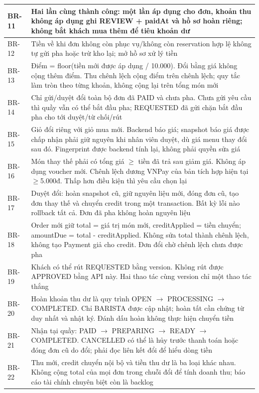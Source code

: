 \begin{longtable}{|>{\raggedright\arraybackslash}p{}|>{\raggedright\arraybackslash}p{}|}
BR-11 & Hai lần cùng thành công: một lần áp dụng cho đơn, khoản thu không áp dụng ghi REVIEW + paidAt và hồ sơ hoàn riêng; không bắt khách mua thêm để tiêu khoản dư \\ \hline
BR-12 & Tiền về khi đơn không còn phục vụ/không còn reservation hợp lệ không tự gửi pha hoặc trừ kho lại; mở hồ sơ xử lý tiền \\ \hline
BR-13 & Điểm = floor(tiền mới được áp dụng / 10.000). Đổi bằng giá không cộng thêm điểm. Thu chênh lệch cộng điểm trên chênh lệch; quy tắc làm tròn theo từng khoản, không cộng lại trên tổng món mới \\ \hline
BR-14 & Chỉ gửi/duyệt đổi toàn bộ đơn đã PAID và chưa pha. Chưa gửi yêu cầu thì quầy vẫn có thể bắt đầu pha; REQUESTED đã gửi chặn bắt đầu pha cho tới duyệt/từ chối/rút \\ \hline
BR-15 & Giỏ đổi riêng với giỏ mua mới. Backend báo giá; snapshot báo giá được chấp nhận phải giữ nguyên khi nhân viên duyệt, dù giá menu thay đổi sau đó. Fingerprint được backend tính lại, không phải quyền sửa giá \\ \hline
BR-16 & Món thay thế phải có tổng giá \(\geq\) tiền đã trả sau giảm giá. Không áp dụng voucher mới. Chênh lệch dương VNPay của bản tích hợp hiện tại \(\geq\)5.000đ. Thấp hơn điều kiện thì yêu cầu chọn lại \\ \hline
BR-17 & Duyệt đổi: hoàn snapshot cũ, giữ nguyên liệu mới, đóng đơn cũ, tạo đơn thay thế và chuyển credit trong một transaction. Bất kỳ lỗi nào rollback tất cả. Đơn đã pha không hoàn nguyên liệu \\ \hline
BR-18 & Order mới giữ total = giá trị món mới, creditApplied = tiền chuyển; amountDue = total - creditApplied. Không sửa total thành chênh lệch, không tạo Payment giả cho credit. Đơn đổi chờ chênh lệch chưa được pha \\ \hline
BR-19 & Khách có thể rút REQUESTED bằng version. Không rút được APPROVED bằng API này. Hai thao tác cùng version chỉ một thao tác thắng \\ \hline
BR-20 & Hoàn khoản thu dư là quy trình OPEN \(\rightarrow\) PROCESSING \(\rightarrow\) COMPLETED. Chỉ BARISTA được cập nhật; hoàn tất cần chứng từ duy nhất và nhật ký. Đánh dấu hoàn không thực hiện chuyển tiền \\ \hline
BR-21 & Nhận tại quầy: PAID \(\rightarrow\) PREPARING \(\rightarrow\) READY \(\rightarrow\) COMPLETED. CANCELLED có thể là hủy trước thanh toán hoặc đóng đơn cũ do đổi; phải đọc liên kết đổi để hiểu dòng tiền \\ \hline
BR-22 & Thu mới, credit chuyển nội bộ và tiền thu dư là ba loại khác nhau. Không cộng total của mọi đơn trong chuỗi đổi để tính doanh thu; báo cáo tài chính chuyên biệt còn là backlog \\ \hline
\end{longtable}
\endgroup
